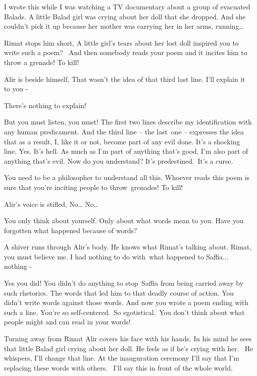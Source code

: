 \documentclass[letterpaper]{article}
\begin{document}
{\textquotedbl}I wrote this while I was watching a TV documentary about a group of evacuated Balads. A little Balad girl
was crying about her doll that she dropped. And she couldn't pick it up because her mother was carrying her in her
arms, running{\dots}{\textquotedbl} 

Rimat stops him short, {\textquotedbl}A little girl's tears about her lost doll inspired you to write such a poem?~ And
then somebody reads your poem and it incites him to throw a grenade! To kill!{\textquotedbl} 

Alir is beside himself, {\textquotedbl}That wasn't the idea of that third last line. I'll explain it to you
-{\textquotedbl} 

{\textquotedbl}There's nothing to explain!{\textquotedbl} 

{\textquotedbl}But you must listen, you must! The first two lines describe my identification with any human predicament.
And the third line -- the last\ one -- expresses the idea that as a result, I, like it or not, become part of any evil
done. It's a shocking line. Yes. It's hell. As much as I'm part of anything that's good, I'm also part of anything
that's evil. Now do you understand? It's predestined.\ It's a curse.{\textquotedbl} 

{\textquotedbl}You need to be a philosopher to understand all this. Whoever reads this poem is sure that you're inciting
people to throw~grenades! To kill!{\textquotedbl} 

Alir's voice is stifled, {\textquotedbl}No{\dots} No{\dots}{\textquotedbl} 

{\textquotedbl}You only think about yourself. Only about what words mean to you. Have you forgotten what happened
because of words?{\textquotedbl}

A shiver runs through Alir's body. He knows what Rimat{}'s talking about. {\textquotedbl}Rimat, you must believe me. I
had nothing to do with~what happened to Saffia... nothing - {\textquotedbl} 

{\textquotedbl}Yes you did! You didn't do anything to stop~Saffia from being carried away by such rhetorics. The words
that led him to that deadly course of action. You didn't write words against those words. And now you wrote a poem
ending with such a line. You're so self-centered.\ So
egotistical.\textcolor[rgb]{0.8901961,0.42352942,0.039215688}{\ }You don't think about what people might and can read
in your words!{\textquotedbl} \ 

Turning away from Rimat Alir covers his face with his hands. In his mind he sees that little Balad girl crying about her
doll. He feels as if he's crying with her. ~He whispers, {\textquotedbl}I'll change that line. At the inauguration
ceremony I'll say that I'm replacing these words with others.~ I'll say this in front of the whole
world.{\textquotedbl}\ 
\end{document}
